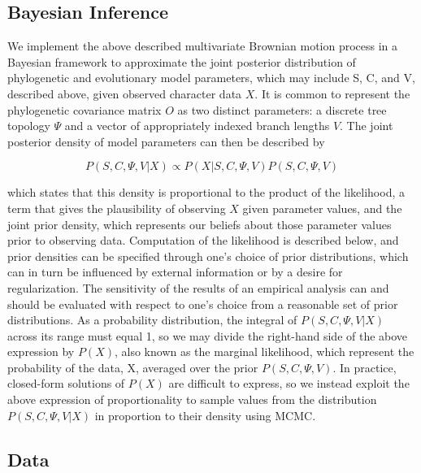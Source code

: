 \documentclass[10pt, twocolumn, twoside]{article}
\begin{document}
\subsection{Bayesian Inference}

We implement the above described multivariate Brownian motion process in a Bayesian framework to approximate the joint posterior distribution of phylogenetic and evolutionary model parameters, which may include S, C, and V, described above, given observed character data $X$. It is common to represent the phylogenetic covariance matrix $O$ as two distinct parameters: a discrete tree topology $\Psi$ and a vector of appropriately indexed branch lengths $V$. The joint posterior density of model parameters can then be described by 

{\[P(S, C, \Psi, V | X) \propto P(X | S, C, \Psi, V) P(S, C, \Psi, V)\]}

which states that this density is proportional to the product of the likelihood, a term that gives the plausibility of observing $X$ given parameter values, and the joint prior density, which represents our beliefs about those parameter values prior to observing data. Computation of the likelihood is described below, and prior densities can be specified through one's choice of prior distributions, which can in turn be influenced by external information or by a desire for regularization. The sensitivity of the results of an empirical analysis can and should be evaluated with respect to one's choice from a reasonable set of prior distributions. As a probability distribution, the integral of $P(S, C, \Psi, V | X)$ across its range must equal 1, so we may divide the right-hand side of the above expression by $P(X)$, also known as the marginal likelihood, which represent the probability of the data, X, averaged over the prior $P(S, C, \Psi, V)$. In practice, closed-form solutions of $P(X)$ are difficult to express, so we instead exploit the above expression of proportionality to sample values from the distribution $P(S, C, \Psi, V | X)$ in proportion to their density using MCMC.

\subsection{Data}
\end{document}
